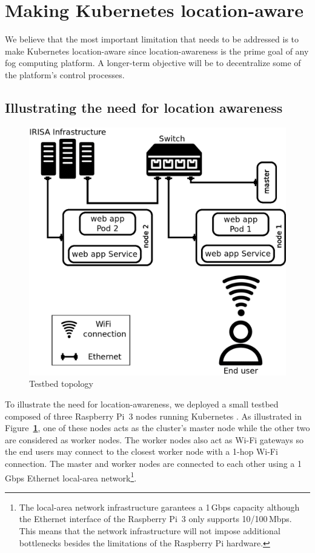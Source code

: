 \documentclass[letterpaper,twocolumn,10pt]{article}
\newcommand{\note}[1]{\noindent{\color{red}\textbf{#1}}}
\newcommand{\notegp}[1]{\note{\color{jazzberryjam}[\textsc{Guillaume:} #1]}}
\let\origref\ref
\def\ref#1{\textbf{\origref{#1}}}
\begin{document}
\section{Making Kubernetes location-aware}\label{sec:road}

We believe that the most important limitation that needs to be
addressed is to make Kubernetes location-aware since location-awareness
is the prime goal of any fog computing platform. A longer-term
objective will be to decentralize some of the platform's control
processes.

\subsection{Illustrating the need for location awareness}

\begin{figure}[tbp]
  \centering
  \includegraphics[width=.9\linewidth]{images/clus.png}
  \caption{Testbed topology}
  \label{fig:clus}
\end{figure}


To illustrate the need for location-awareness, we deployed a small
testbed composed of three Raspberry Pi~3 nodes running Kubernetes
\notegp{which version?}. As illustrated in Figure~\ref{fig:clus}, one
of these nodes acts as the cluster's master node while the other two
are considered as worker nodes. The worker nodes also act as Wi-Fi
gateways so the end users may connect to the closest worker node with
a 1-hop Wi-Fi connection. The master and worker nodes are connected to
each other using a 1\,Gbps Ethernet local-area network\footnote{The
  local-area network infrastructure garantees a 1\,Gbps capacity
  although the Ethernet interface of the Raspberry Pi~3 only supports
  10/100\,Mbps. This means that the network infrastructure will not
  impose additional bottlenecks besides the limitations of the
  Raspberry Pi hardware.}.
\end{document}
